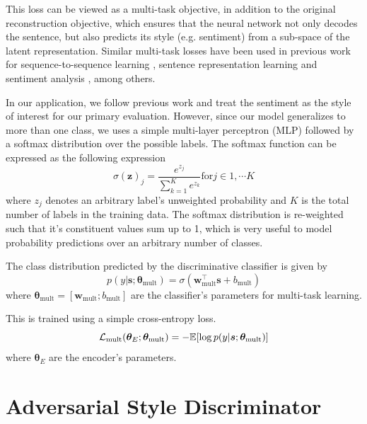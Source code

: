 This loss can be viewed as a multi-task objective, in addition to the original reconstruction objective, which ensures that the neural network not only decodes the sentence, but also predicts its style (e.g. sentiment) from a sub-space of the latent representation. Similar multi-task losses have been used in previous work for sequence-to-sequence learning \citep{luong2015multi}, sentence representation learning \citep{jernite2017discourse} and sentiment analysis \citep{balikas2017multitask}, among others.

In our application, we follow previous work \citep{hu2017toward,shen2017style,fu2017style} and treat the sentiment as the style of interest for our primary evaluation. However, since our model generalizes to more than one class, we uses a simple multi-layer perceptron (MLP) followed by a softmax distribution over the possible labels. The softmax function can be expressed as the following expression
\begin{equation*}
	\sigma(\mathbf{z})_j = \frac{e^{z_j}}{\sum_{k=1}^K e^{z_k}} \text{for} j \in {1, \cdots K}
\end{equation*}
where $z_j$ denotes an arbitrary label's unweighted probability and $K$ is the total number of labels in the training data. The softmax distribution is re-weighted such that it's constituent values sum up to 1, which is very useful to model probability predictions over an arbitrary number of classes.

The class distribution predicted by the discriminative classifier is given by
\begin{equation} \label{eqn:class-pred}
	p(y | \bm s; \bm\theta_\text{mult}) = \sigma(\bm w_\text{mult}^\top \bm s + b_\text{mult})
\end{equation}
where $\bm\theta_\text{mult}=[\bm w_\text{mult}; b_\text{mult}]$ are the classifier's parameters for multi-task learning.

This is trained using a simple cross-entropy loss.
\begin{equation} \label{eqn:multi-task-loss}
	\mathcal{L}_\text{mult}(\bm\theta_{E};\bm\theta_\text{mult}) =
	- \mathbb{E} [\log p(y | \bm s; \bm\theta_\text{mult})]
\end{equation}
where $\bm\theta_E$ are the encoder's parameters.


\section{Adversarial Style Discriminator} \label{sec:adversarial-style-objective}

